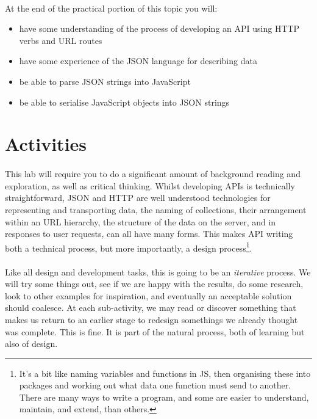 \documentclass[10pt, a4paper, twosize]{article}
\begin{document}
\paragraph{} At the end of the practical portion of this topic you will:

\begin{itemize}
\item have some understanding of the process of developing an API using HTTP verbs and URL routes
\item have some experience of the JSON language for describing data
\item be able to parse JSON strings into JavaScript
\item be able to serialise JavaScript objects into JSON strings
\end{itemize}




\section{Activities}
\paragraph{} This lab will require you to do a significant amount of background reading and exploration, as well as critical thinking. Whilst developing APIs is technically straightforward, JSON and HTTP are well understood technologies for representing and transporting data, the naming of collections, their arrangement within an URL hierarchy, the structure of the data on the server, and in responses to user requests, can all have many forms. This makes API writing both a technical process, but more importantly, a design process\footnote{It's a bit like naming variables and functions in JS, then organising these into packages and working out what data one function must send to another. There are many ways to write a program, and some are easier to understand, maintain, and extend, than others.}.

\paragraph{} Like all design and development tasks, this is going to be an \emph{iterative} process. We will try some things out, see if we are happy with the results, do some research, look to other examples for inspiration, and eventually an acceptable solution should coalesce. At each sub-activity, we may read or discover something that makes us return to an earlier stage to redesign somethings we already thought was complete. This is fine. It is part of the natural process, both of learning but also of design.
\end{document}
